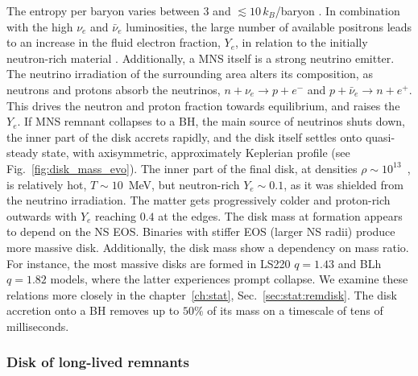 The entropy per baryon varies between $3$ and $\lesssim 10\,$$k_{B}$/baryon \citep{Perego:2019adq}.
In combination with the high $\nu_e$ and $\bar{\nu}_e$ luminosities,
the large number of available positrons leads to an increase 
in the fluid electron fraction, $Y_e$, in relation to the initially neutron-rich material
\citep{Qian:1996xt}.
%
Additionally, a \ac{MNS} itself is a strong neutrino emitter. The neutrino irradiation of the 
surrounding area alters its composition, as neutrons and protons absorb the neutrinos,
$n+\nu_e\rightarrow p + e^{-}$ and $p + \bar{\nu}_e\rightarrow n + e^+$.
This drives the neutron and proton fraction towards equilibrium, and raises the $Y_e$.
If \ac{MNS} remnant collapses to a \ac{BH}, the main source of neutrinos shuts down,  
the inner part of the disk accrets rapidly, and the disk itself settles onto quasi-steady state, 
with axisymmetric, approximately Keplerian profile (see Fig.~\ref{fig:disk_mass_evo}).
%
The inner part of the final disk, at densities $\rho\sim10^{13}$~\gcm, 
is relatively hot, $T\sim10\,$ MeV, but neutron-rich $Y_e\sim0.1$, as it was shielded 
from the neutrino irradiation. The matter gets progressively colder and proton-rich 
outwards with $Y_e$ reaching $0.4$ at the edges.
%
The disk mass at formation appears to depend on the \ac{NS} \ac{EOS}. Binaries with 
stiffer \ac{EOS} (larger \ac{NS} radii) produce more massive disk.
Additionally, the disk mass show a dependency on mass ratio. For instance, the most massive 
disks are formed in LS220 $q=1.43$ and  BLh $q=1.82$ models, where the latter experiences prompt collapse.
%
We examine these relations more closely in the chapter~\ref{ch:stat}, Sec.~\ref{sec:stat:remdisk}.
%
The disk accretion onto a \ac{BH} removes up to $50\%$ of its mass on a timescale of tens of milliseconds.


\subsubsection*{Disk of long-lived remnants}


